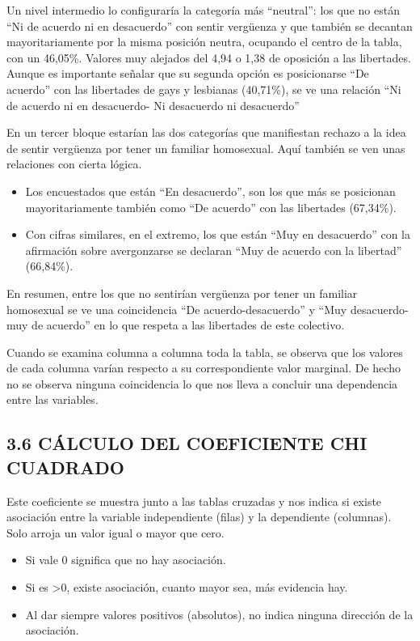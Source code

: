 \documentclass[
  12 pt,
  a4paper,
]{article}
\providecommand{\tightlist}{%
  \setlength{\itemsep}{0pt}\setlength{\parskip}{0pt}}
\begin{document}
Un nivel intermedio lo configuraría la categoría más ``neutral'': los
que no están ``Ni de acuerdo ni en desacuerdo'' con sentir vergüenza y
que también se decantan mayoritariamente por la misma posición neutra,
ocupando el centro de la tabla, con un 46,05\%. Valores muy alejados del
4,94 o 1,38 de oposición a las libertades. Aunque es importante señalar
que su segunda opción es posicionarse ``De acuerdo'' con las libertades
de gays y lesbianas (40,71\%), se ve una relación ``Ni de acuerdo ni en
desacuerdo- Ni desacuerdo ni desacuerdo''

En un tercer bloque estarían las dos categorías que manifiestan rechazo
a la idea de sentir vergüenza por tener un familiar homosexual. Aquí
también se ven unas relaciones con cierta lógica.

\begin{itemize}
\item
  Los encuestados que están ``En desacuerdo'', son los que más se
  posicionan mayoritariamente también como ``De acuerdo'' con las
  libertades (67,34\%).
\item
  Con cifras similares, en el extremo, los que están ``Muy en
  desacuerdo'' con la afirmación sobre avergonzarse se declaran ``Muy de
  acuerdo con la libertad'' (66,84\%).
\end{itemize}

En resumen, entre los que no sentirían vergüenza por tener un familiar
homosexual se ve una coincidencia ``De acuerdo-desacuerdo'' y ``Muy
desacuerdo-muy de acuerdo'' en lo que respeta a las libertades de este
colectivo.

Cuando se examina columna a columna toda la tabla, se observa que los
valores de cada columna varían respecto a su correspondiente valor
marginal. De hecho no se observa ninguna coincidencia lo que nos lleva a
concluir una dependencia entre las variables.

\newpage

\subsection{3.6 CÁLCULO DEL COEFICIENTE CHI
CUADRADO}\label{cuxe1lculo-del-coeficiente-chi-cuadrado}

Este coeficiente se muestra junto a las tablas cruzadas y nos indica si
existe asociación entre la variable independiente (filas) y la
dependiente (columnas). Solo arroja un valor igual o mayor que cero.

\begin{itemize}
\tightlist
\item
  Si vale 0 significa que no hay asociación.
\item
  Si es \textgreater0, existe asociación, cuanto mayor sea, más
  evidencia hay.
\item
  Al dar siempre valores positivos (absolutos), no indica ninguna
  dirección de la asociación.
\end{itemize}
\end{document}
